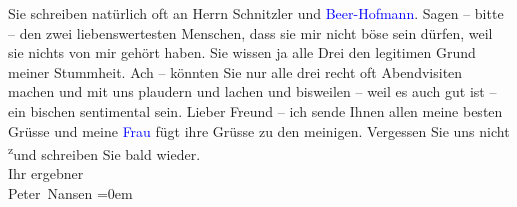            Sie schreiben natürlich oft an Herrn Schnitzler und \textcolor{blue}{Beer-Hofmann}{}\ledrightnote{\textcolor{blue}{Richard Beer-Hofmann}}. Sagen – bitte – den zwei liebenswertesten Menschen, dass sie
               mir nicht böse sein dürfen, weil sie nichts von mir gehört haben. Sie wissen ja alle
                  {\pb}Drei den legitimen Grund meiner Stummheit.\pend
           \pstart
           Ach –
               könnten Sie nur alle drei recht oft \strikeout{\textcolor{gray}{ein}} Abendvisiten machen und mit uns plaudern und
               lachen und bisweilen – weil es auch gut ist – ein bischen sentimental sein.\pend
           \pstart
           Lieber Freund – ich sende Ihnen allen meine besten Grüsse und meine \textcolor{blue}{Frau}{} fügt ihre Grüsse zu den meinigen.\pend
           \pstart
           Vergessen Sie uns nicht \substVorne{}\textsuperscript{z}\substDazwischen{}u\substHinten{}nd schreiben Sie bald wieder.{\\[\baselineskip]} Ihr ergebner{\\[\baselineskip]}\spacefill\mbox{Peter Nansen}\pend
           \leftskip=0em{}\endnumbering{}  
      